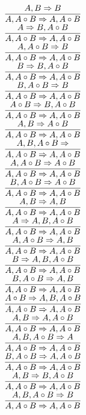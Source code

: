 \documentclass[11pt]{article}
\begin{document}
\begin{center}
\bigskip
\\$\infer{A, A\circ B\Rightarrow A, A\circ B}{A, B\Rightarrow B}$
\bigskip
\\$\infer{A, A\circ B\Rightarrow A, A\circ B}{A\Rightarrow B, A\circ B}$
\bigskip
\\$\infer{A, A\circ B\Rightarrow A, A\circ B}{A, A\circ B\Rightarrow B}$
\bigskip
\\$\infer{A, A\circ B\Rightarrow A, A\circ B}{B\Rightarrow B, A\circ B}$
\bigskip
\\$\infer{A, A\circ B\Rightarrow A, A\circ B}{B, A\circ B\Rightarrow B}$
\bigskip
\\$\infer{A, A\circ B\Rightarrow A, A\circ B}{A\circ B\Rightarrow B, A\circ B}$
\bigskip
\\$\infer{A, A\circ B\Rightarrow A, A\circ B}{A, B\Rightarrow A\circ B}$
\bigskip
\\$\infer{A, A\circ B\Rightarrow A, A\circ B}{A, B, A\circ B\Rightarrow }$
\bigskip
\\$\infer{A, A\circ B\Rightarrow A, A\circ B}{A, A\circ B\Rightarrow A\circ B}$
\bigskip
\\$\infer{A, A\circ B\Rightarrow A, A\circ B}{B, A\circ B\Rightarrow A\circ B}$
\bigskip
\\$\infer{A, A\circ B\Rightarrow A, A\circ B}{A, B\Rightarrow A, B}$
\bigskip
\\$\infer{A, A\circ B\Rightarrow A, A\circ B}{A\Rightarrow A, B, A\circ B}$
\bigskip
\\$\infer{A, A\circ B\Rightarrow A, A\circ B}{A, A\circ B\Rightarrow A, B}$
\bigskip
\\$\infer{A, A\circ B\Rightarrow A, A\circ B}{B\Rightarrow A, B, A\circ B}$
\bigskip
\\$\infer{A, A\circ B\Rightarrow A, A\circ B}{B, A\circ B\Rightarrow A, B}$
\bigskip
\\$\infer{A, A\circ B\Rightarrow A, A\circ B}{A\circ B\Rightarrow A, B, A\circ B}$
\bigskip
\\$\infer{A, A\circ B\Rightarrow A, A\circ B}{A, B\Rightarrow A, A\circ B}$
\bigskip
\\$\infer{A, A\circ B\Rightarrow A, A\circ B}{A, B, A\circ B\Rightarrow A}$
\bigskip
\\$\infer{A, A\circ B\Rightarrow A, A\circ B}{B, A\circ B\Rightarrow A, A\circ B}$
\bigskip
\\$\infer{A, A\circ B\Rightarrow A, A\circ B}{A, B\Rightarrow B, A\circ B}$
\bigskip
\\$\infer{A, A\circ B\Rightarrow A, A\circ B}{A, B, A\circ B\Rightarrow B}$

\end{center}
\end{document}
